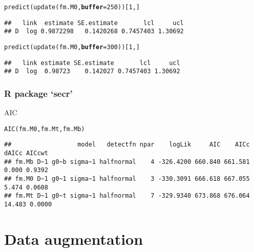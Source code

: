 \documentclass[color=usenames,dvipsnames]{beamer}\usepackage[]{graphicx}\usepackage[]{color}
\makeatletter
\newcommand{\hlnum}[1]{\textcolor[rgb]{0.69,0.494,0}{#1}}%
\newcommand{\hlstd}[1]{\textcolor[rgb]{0,0,0}{#1}}%
\newcommand{\hlkwc}[1]{\textcolor[rgb]{0,0,0}{\textbf{#1}}}%
\newcommand{\hlkwd}[1]{\textcolor[rgb]{0.004,0.004,0.506}{#1}}%
\newenvironment{kframe}{%
 \def\at@end@of@kframe{}%
 \ifinner\ifhmode%
  \def\at@end@of@kframe{\end{minipage}}%
  \begin{minipage}{\columnwidth}%
 \fi\fi%
 \def\FrameCommand##1{\hskip\@totalleftmargin \hskip-\fboxsep
 \colorbox{shadecolor}{##1}\hskip-\fboxsep
     \hskip-\linewidth \hskip-\@totalleftmargin \hskip\columnwidth}%
 \MakeFramed {\advance\hsize-\width
   \@totalleftmargin\z@ \linewidth\hsize
   \@setminipage}}%
 {\par\unskip\endMakeFramed%
 \at@end@of@kframe}
\newenvironment{knitrout}{}{} %
\makeatother
\begin{document}
\begin{frame}[fragile]
\begin{knitrout}
\begin{kframe}
\begin{alltt}
\hlkwd{predict}\hlstd{(}\hlkwd{update}\hlstd{(fm.M0,} \hlkwc{buffer}\hlstd{=}\hlnum{250}\hlstd{))[}\hlnum{1}\hlstd{,]}
\end{alltt}
\begin{verbatim}
##   link  estimate SE.estimate       lcl     ucl
## D  log 0.9872298   0.1420268 0.7457403 1.30692
\end{verbatim}
\end{kframe}
\end{knitrout}
\pause
\vspace{-12pt}
\begin{knitrout}\scriptsize
{}\color{fgcolor}\begin{kframe}
\begin{alltt}
\hlkwd{predict}\hlstd{(}\hlkwd{update}\hlstd{(fm.M0,} \hlkwc{buffer}\hlstd{=}\hlnum{300}\hlstd{))[}\hlnum{1}\hlstd{,]}
\end{alltt}
\begin{verbatim}
##   link estimate SE.estimate       lcl     ucl
## D  log  0.98723    0.142027 0.7457403 1.30692
\end{verbatim}
\end{kframe}
\end{knitrout}
\end{frame}



\begin{frame}[fragile]
  \frametitle{R package `secr'}
  AIC
\begin{knitrout}\tiny
{}\color{fgcolor}\begin{kframe}
\begin{alltt}
\hlkwd{AIC}\hlstd{(fm.M0, fm.Mt, fm.Mb)}
\end{alltt}
\begin{verbatim}
##                  model   detectfn npar    logLik     AIC    AICc  dAICc AICcwt
## fm.Mb D~1 g0~b sigma~1 halfnormal    4 -326.4200 660.840 661.581  0.000 0.9392
## fm.M0 D~1 g0~1 sigma~1 halfnormal    3 -330.3091 666.618 667.055  5.474 0.0608
## fm.Mt D~1 g0~t sigma~1 halfnormal    7 -329.9340 673.868 676.064 14.483 0.0000
\end{verbatim}
\end{kframe}
\end{knitrout}
\end{frame}


\section{Data augmentation}
\end{document}
